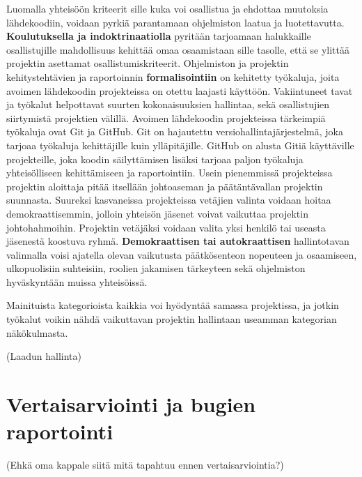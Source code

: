 \documentclass[utf8]{gradu3}
\begin{document}
Luomalla yhteisöön kriteerit sille kuka voi osallistua ja ehdottaa muutoksia
lähdekoodiin, voidaan pyrkiä parantamaan ohjelmiston laatua ja luotettavutta.
\textbf{Koulutuksella ja indoktrinaatiolla} pyritään tarjoamaan halukkaille
osallistujille mahdollisuus kehittää omaa osaamistaan sille tasolle, että se
ylittää projektin asettamat osallistumiskriteerit.%
Ohjelmiston ja projektin kehitystehtävien ja raportoinnin
\textbf{formalisointiin} on kehitetty työkaluja, joita avoimen lähdekoodin
projekteissa on otettu laajasti käyttöön. Vakiintuneet tavat ja työkalut
helpottavat suurten kokonaisuuksien hallintaa, sekä osallistujien siirtymistä
projektien välillä. Avoimen lähdekoodin projekteissa tärkeimpiä työkaluja ovat
Git ja GitHub. Git on hajautettu versiohallintajärjestelmä, joka tarjoaa
työkaluja kehittäjille kuin ylläpitäjille. GitHub on alusta Gitiä käyttäville
projekteille, joka koodin säilyttämisen lisäksi tarjoaa paljon työkaluja
yhteisölliseen kehittämiseen ja raportointiin.%
Usein pienemmissä projekteissa projektin aloittaja pitää itsellään johtoaseman
ja päätäntävallan projektin suunnasta. Suureksi kasvaneissa projekteissa
vetäjien valinta voidaan hoitaa demokraattisemmin, jolloin yhteisön jäsenet
voivat vaikuttaa projektin johtohahmoihin. Projektin vetäjäksi voidaan valita
yksi henkilö tai useasta jäsenestä koostuva ryhmä. \textbf{Demokraattisen tai
autokraattisen} hallintotavan valinnalla voisi ajatella olevan vaikutusta
päätkösenteon nopeuteen ja osaamiseen, ulkopuolisiin suhteisiin, roolien
jakamisen tärkeyteen sekä ohjelmiston hyväskyntään muissa yhteisöissä.%

Mainituista kategorioista kaikkia voi hyödyntää samassa projektissa, ja jotkin
työkalut voikin nähdä vaikuttavan projektin hallintaan useamman kategorian
näkökulmasta.



(Laadun hallinta)

\section{Vertaisarviointi ja bugien raportointi}
(Ehkä oma kappale siitä mitä tapahtuu ennen vertaisarviointia?)
\end{document}
